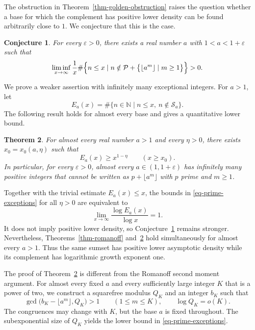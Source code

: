 \documentclass[11pt,reqno]{amsart}
\numberwithin{equation}{section}
\newtheorem{theorem}{Theorem}[section]
\newtheorem{conjecture}[theorem]{Conjecture}
\begin{document}
    The obstruction in Theorem~\ref{thm-golden-obstruction} raises the question whether a base for which the complement has positive lower density can be found arbitrarily close to $1$. We conjecture that this is the case.

    \begin{conjecture}\label{conj-near-one-obstruction}
        For every $\varepsilon>0$, there exists a real number $a$ with $1<a<1+\varepsilon$ such that
        $$
        \liminf_{x\to\infty}\frac{1}{x}
        \#\Bigl\{n\le x\mid
        n\notin \mathcal{P}+\bigl\{\lfloor a^m\rfloor\mid m\ge1\bigr\}\Bigr\}>0.
        $$
    \end{conjecture}

    We prove a weaker assertion with infinitely many exceptional integers. For $a>1$, let
    \[
     E_a(x)=\#\bigl\{n\in\mathbb{N}\mid n\le x,\ n\notin\mathcal{S}_a\bigr\}.
    \]
    The following result holds for almost every base and gives a quantitative lower bound.

    \begin{theorem}\label{thm-prime-exceptions}
    For almost every real number $a>1$ and every $\eta>0$, there exists $x_0=x_0(a,\eta)$ such that
    \begin{equation}\label{eq-prime-exceptions}
     E_a(x)\ge x^{1-\eta}\qquad(x\ge x_0).
    \end{equation}
    In particular, for every $\varepsilon>0$, almost every $a\in(1,1+\varepsilon)$ has infinitely many positive integers that cannot be written as $p+\lfloor a^m\rfloor$ with $p$ prime and $m\ge1$.
    \end{theorem}

    Together with the trivial estimate $E_a(x)\le x$, the bounds in \eqref{eq-prime-exceptions} for all $\eta>0$ are equivalent to
    \[
     \lim_{x\to\infty}\frac{\log E_a(x)}{\log x}=1.
    \]
    It does not imply positive lower density, so Conjecture~\ref{conj-near-one-obstruction} remains stronger. Nevertheless, Theorems~\ref{thm-romanoff} and~\ref{thm-prime-exceptions} hold simultaneously for almost every $a>1$. Thus the same sumset has positive lower asymptotic density while its complement has logarithmic growth exponent one.

    The proof of Theorem~\ref{thm-prime-exceptions} is different from the Romanoff second moment argument. For almost every fixed $a$ and every sufficiently large integer $K$ that is a power of two, we construct a squarefree modulus $Q_K$ and an integer $b_K$ such that
    \[
     \gcd\bigl(b_K-\lfloor a^m\rfloor,Q_K\bigr)>1\qquad(1\le m\le K),
     \qquad
     \log Q_K=o(K).
    \]
    The congruences may change with $K$, but the base $a$ is fixed throughout. The subexponential size of $Q_K$ yields the lower bound in \eqref{eq-prime-exceptions}.
\end{document}
